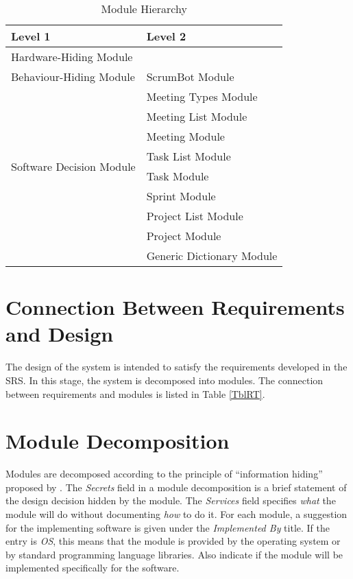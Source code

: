 \documentclass[12pt, titlepage]{article}
\begin{document}
\begin{table}[h!]
\centering
\begin{tabular}{p{} p{}}
\toprule
\textbf{Level 1} & \textbf{Level 2}\\
\midrule

{Hardware-Hiding Module} & ~ \\
\midrule

\multirow{1}{0.3\textwidth}{Behaviour-Hiding Module} 
& ScrumBot Module\\         %
\midrule

\multirow{8}{0.3\textwidth}{Software Decision Module} 
& Meeting Types Module\\    %
& Meeting List Module\\     %
& Meeting Module\\          %
& Task List Module\\        %
& Task Module\\             %
& Sprint Module\\           %
& Project List Module\\     %
& Project Module\\          %
& Generic Dictionary Module\\   %
\bottomrule

\end{tabular}
\caption{Module Hierarchy}
\label{TblMH}
\end{table}

\section{Connection Between Requirements and Design} \label{SecConnection}

The design of the system is intended to satisfy the requirements developed in
the SRS. In this stage, the system is decomposed into modules. The connection
between requirements and modules is listed in Table \ref{TblRT}.

\section{Module Decomposition} \label{SecMD}

Modules are decomposed according to the principle of ``information hiding'' proposed by \citet{ParnasEtAl1984}. The \emph{Secrets} field in a module decomposition is a brief statement of the design decision hidden by the module. The \emph{Services} field specifies \emph{what} the module will do without documenting \emph{how} to do it. For each module, a suggestion for the implementing software is given under the \emph{Implemented By} title. If the entry is \emph{OS}, this means that the module is provided by the operating system or by standard programming language libraries.  Also indicate if the module will be implemented specifically for the software.
\end{document}

